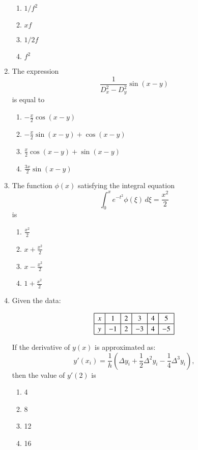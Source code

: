 \documentclass[journal,12pt,onecolumn]{IEEEtran}
\theoremstyle{remark}
\begin{document}
\begin{enumerate}[start=14]
\begin{enumerate}
    \item \( 1 / f^2 \)
    \item \( x f \)
    \item \( 1 / 2 f \)
    \item \( f^2 \)
\end{enumerate}

\item The expression 
\[
\frac{1}{D_x^2 - D_y^2} \sin(x - y) 
\]
is equal to

\begin{enumerate}
    \item \( -\frac{x}{2} \cos(x - y) \)
    \item \( -\frac{x}{2} \sin(x - y) + \cos(x - y) \)
    \item \( \frac{x}{2} \cos(x - y) + \sin(x - y) \)
    \item \( \frac{3x}{2} \sin(x - y) \)
\end{enumerate}

\item The function \( \phi(x) \) satisfying the integral equation
\[
\int_0^x e^{-t^2} \phi(\xi) \, d\xi = \frac{x^2}{2}
\]
is

\begin{enumerate}
    \item \( \frac{x^2}{2} \)
    \item \( x + \frac{x^2}{2} \)
    \item \( x - \frac{x^2}{2} \)
    \item \( 1 + \frac{x^2}{2} \)
\end{enumerate}

\item Given the data:

\[
\renewcommand{\arraystretch}{1.2}
\setlength{\arrayrulewidth}{0.6pt}
\begin{array}{|c|c|c|c|c|c|}
\hline
x & 1 & 2 & 3 & 4 & 5 \\ 
\hline
y & -1 & 2 & -3 & 4 & -5 \\ 
\hline
\end{array}
\]


If the derivative of \( y(x) \) is approximated as:
\[
y'(x_i) = \frac{1}{h} \left( \Delta y_i + \frac{1}{2} \Delta^2 y_i - \frac{1}{4} \Delta^3 y_i \right),
\]
then the value of \( y'(2) \) is

\begin{enumerate}
    \item 4
    \item 8
    \item 12
    \item 16
\end{enumerate}


\end{enumerate}
\end{document}
